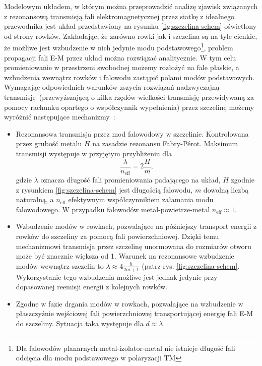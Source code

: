 Modelowym układem, w którym można przeprowadzić analizę zjawisk związanych z rezonansową transmisją fali elektromagnetycznej przez siatkę z idealnego przewodnika jest układ przedstawiony na rysunku \ref{fig:szczelina-schem} oświetlony od strony rowków. Zakładając, że zarówno rowki jak i szczelina są na tyle cienkie, że możliwe jest wzbudzenie w nich jedynie modu podstawowego\footnote{Dla falowodów planarnych metal-izolator-metal nie istnieje długość fali odcięcia dla modu podstawowego w polaryzacji TM}, problem propagacji fali E-M przez układ można rozwiązać analitycznie. W tym celu promieniowanie w przestrzeni swobodnej możemy rozłożyć na fale płaskie, a wzbudzenia wewnątrz rowków i falowodu zastąpić polami modów podstawowych. Wymagając odpowiednich warunków zszycia rozwiązań nadzwyczajną transmisję~(przewyższającą o kilka rzędów wielkości transmisję przewidywaną za pomocy rachunku opartego o współczynnik wypełnienia) przez szczelinę możemy wyróżnić następujące mechanizmy~\cite{martin2001theory}:
\begin{itemize}
	\item Rezonansowa transmisja przez mod falowodowy w szczelinie. Kontrolowana przez grubość metalu $H$ na zasadzie rezonansu Fabry-P\'{e}rot. Maksimum transmisji występuje w przyjętym przybliżeniu dla
\begin{equation}
\frac{\lambda}{n_{\textrm{eff}}} = 2 \frac {H}{m},
\label{eq:fp-szczelina}
\end{equation}
gdzie $\lambda$ oznacza długość fali promieniowania padającego na układ, $H$ zgodnie z rysunkiem \ref{fig:szczelina-schem} jest długością falowodu, $m$ dowolną liczbą naturalną, a $n_{\textrm{eff}}$ efektywnym współczynnikiem załamania modu falowodowego. W przypadku falowodów metal-powietrze-metal $n_{\textrm{eff}} \approx 1$.
	\item Wzbudzenie modów w rowkach, pozwalające na późniejszy transport energii z rowków do szczeliny za pomocą fali powierzchniowej. Dzięki temu mechanizmowi transmisja przez szczelinę unormowana do rozmiarów otworu może być znacznie większa od 1. Warunek na rezonansowe wzbudzenie modów wewnątrz szczelin to $\lambda \approx 4 \frac {h}{2m+1}$ (patrz rys. \ref{fig:szczelina-schem}. Wykorzystanie tego wzbudzenia możliwe jest jednak jedynie przy dopasowanej reemisji energii z kolejnych rowków.
	\item Zgodne w fazie drgania modów w rowkach, pozwalające na wzbudzenie w płaszczyźnie wejściowej fali powierzchniowej transportującej energię fali E-M do szczeliny. Sytuacja taka występuje dla $d \approx \lambda$.
\end{itemize}

